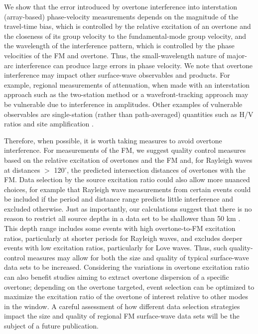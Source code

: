 \documentclass[extra,mreferee]{gji}
\begin{document}
We show that the error introduced by overtone interference into interstation (array-based) phase-velocity measurements depends on the magnitude of the travel-time bias, which is controlled by the relative excitation of an overtone and the closeness of its group velocity to the fundamental-mode group velocity, and the wavelength of the interference pattern, which is controlled by the phase velocities of the FM and overtone. Thus, the small-wavelength nature of major-arc interference can produce large errors in phase velocity. We note that overtone interference may impact other surface-wave observables and products. For example, regional measurements of attenuation, when made with an interstation approach such as the two-station method \citep{zhou2020rayleigh} or a wavefront-tracking approach \citep{xbaoattenuationsurfacewaves} may be vulnerable due to interference in amplitudes. Other examples of vulnerable observables are single-station (rather than path-averaged) quantities such as H/V ratios \citep{tanimoto2008zh} and site amplification \citep{eddy2014local,schardong2019anatomy}. 

Therefore, when possible, it is worth taking measures to avoid overtone interference. For measurements of the FM, we suggest quality control measures based on the relative excitation of overtones and the FM and, for Rayleigh waves at distances $>$ 120$^\circ$, the predicted intersection distances of overtones with the FM. Data selection by the source excitation ratio could also allow more nuanced choices, for example that Rayleigh wave measurements from certain events could be included if the period and distance range predicts little interference and excluded otherwise. Just as importantly, our calculations suggest that there is no reason to restrict all source depths in a data set to be shallower than 50 km  \citep[e.g.][]{jin2015crust,accardo2017surface,adams2018relationships,babikoff2019long}. This depth range includes some events with high overtone-to-FM excitation ratios, particularly at shorter periods for Rayleigh waves, and excludes deeper events with low excitation ratios, particularly for Love waves. Thus, such quality-control measures may allow for both the size and quality of typical surface-wave data sets to be increased. Considering the variations in overtone excitation ratio can also benefit studies aiming to extract overtone dispersion of a specific overtone; depending on the overtone targeted, event selection can be optimized to maximize the excitation ratio of the overtone of interest relative to other modes in the window.  A careful assessment of how different data selection strategies impact the size and quality of regional FM surface-wave data sets will be the subject of a future publication.  
\end{document}
